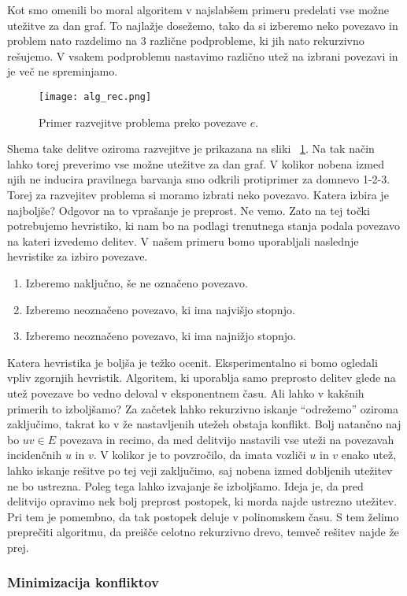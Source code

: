 \documentclass[12pt,a4paper,twoside]{article}
\theoremstyle{definition} %
\theoremstyle{plain} %
\numberwithin{equation}{section}  %
\begin{document}
Kot smo omenili bo moral algoritem v najslabšem primeru predelati vse možne utežitve za dan graf. To najlažje dosežemo, tako da si izberemo neko povezavo in problem nato razdelimo na $3$ različne podprobleme, ki jih nato rekurzivno rešujemo. V vsakem podproblemu nastavimo različno utež na izbrani povezavi in je več ne spreminjamo.
 \begin{figure}[h!]
\caption{Primer razvejitve problema preko povezave $e$.}
\label{alg_rec}
\centering
    \texttt{[image: alg\_rec.png]}
    \end{figure}
Shema take delitve oziroma razvejitve je prikazana na sliki ~\ref{alg_rec}. Na tak način lahko torej preverimo vse možne utežitve za dan graf. V kolikor nobena izmed njih ne inducira pravilnega barvanja smo odkrili protiprimer za domnevo 1-2-3. Torej za razvejitev problema si moramo izbrati neko povezavo. Katera izbira je najboljše? Odgovor na to vprašanje je preprost. Ne vemo. Zato na tej točki potrebujemo hevristiko, ki nam bo na podlagi trenutnega stanja podala povezavo na kateri izvedemo delitev. V našem primeru bomo uporabljali naslednje hevristike za izbiro povezave.
\begin{enumerate}
\item Izberemo naključno, še ne označeno povezavo.
\item Izberemo neoznačeno povezavo, ki ima najvišjo stopnjo.
\item Izberemo neoznačeno povezavo, ki ima najnižjo stopnjo.
\end{enumerate}
Katera hevristika je boljša je težko ocenit. Eksperimentalno si bomo ogledali vpliv zgornjih hevristik. Algoritem, ki uporablja samo preprosto delitev glede na utež povezave bo vedno deloval v eksponentnem času. Ali lahko v kakšnih primerih to izboljšamo? Za začetek lahko rekurzivno iskanje ``odrežemo'' oziroma zaključimo, takrat ko v že nastavljenih utežeh obstaja konflikt. Bolj natančno naj bo $uv \in E$ povezava in recimo, da med delitvijo nastavili vse uteži na povezavah incidenčnih $u$ in $v$. V kolikor je to povzročilo, da imata vozliči $u$ in $v$ enako utež, lahko iskanje rešitve po tej veji zaključimo, saj nobena izmed dobljenih utežitev ne bo ustrezna. Poleg tega lahko izvajanje še izboljšamo. Ideja je, da pred delitvijo opravimo nek bolj preprost postopek, ki morda najde ustrezno utežitev. Pri tem je pomembno, da tak postopek deluje v polinomskem času. S tem želimo preprečiti algoritmu, da preišče celotno rekurzivno drevo, temveč rešitev najde že prej.

\subsubsection{Minimizacija konfliktov}
\end{document}
